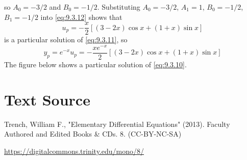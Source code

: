 \documentclass{ximera}
\begin{document}
\begin{example}
\begin{explanation}
so $A_0=-3/2$ and $B_0=-1/2$.
Substituting $A_0=-3/2$, $A_1=1$, $B_0=-1/2$, $B_1=-1/2$ into
\eqref{eq:9.3.12} shows that
$$
u_p=-\frac{x}{2}\left[(3-2x)\cos
x+(1+x)\sin x\right]
$$
is a particular solution of  \eqref{eq:9.3.11}, so
$$
 y_p=e^{-x}u_p=-\frac{xe^{-x}}{2}\left[(3-2x)\cos
x+(1+x)\sin x\right]
$$
The figure below shows a particular  solution of \eqref{eq:9.3.10}.

\begin{center}
\end{center}


\end{explanation}
\end{example}


\section*{Text Source}
Trench, William F., "Elementary Differential Equations" (2013). Faculty Authored and Edited Books \& CDs. 8. (CC-BY-NC-SA)

\href{https://digitalcommons.trinity.edu/mono/8/}{https://digitalcommons.trinity.edu/mono/8/}
\end{document}
